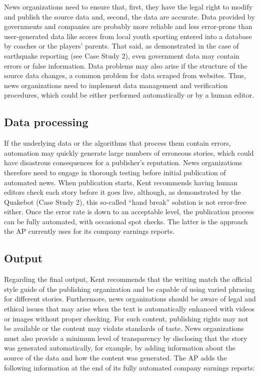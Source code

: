 \documentclass[notoc, symmetric, nobib, nols]{towcenter-guideto-book}
\begin{document}
News organizations need to ensure that, first, they have the legal right to modify and publish the source data and, second, the data are accurate. Data provided by governments and companies are probably more reliable and less error-prone than user-generated data like scores from local youth sporting entered into a database by coaches or the players' parents. That said, as demonstrated in the case of earthquake reporting (see Case Study 2), even government data may contain errors or false information. Data problems may also arise if the structure of the source data changes, a common problem for data scraped from websites. Thus, news organizations need to implement data management and verification procedures, which could be either performed automatically or by a human editor.

\subsection{Data processing}

If the underlying data or the algorithms that process them contain errors, automation may quickly generate large numbers of erroneous stories, which could have disastrous consequences for a publisher's reputation. News organizations therefore need to engage in thorough testing before initial publication of automated news. When publication starts, Kent recommends having human editors check each story before it goes live, although, as demonstrated by the Quakebot (Case Study 2), this so-called ``hand break'' solution is not error-free either. Once the error rate is down to an acceptable level, the publication process can be fully automated, with occasional spot checks. The latter is the approach the AP currently uses for its company earnings reports.

\subsection{Output} 

Regarding the final output, Kent recommends that the writing match the official style guide of the publishing organization and be capable of using varied phrasing for different stories. Furthermore, news organizations should be aware of legal and ethical issues that may arise when the text is automatically enhanced with videos or images without proper checking. For such content, publishing rights may not be available or the content may violate standards of taste. News organizations must also provide a minimum level of transparency by disclosing that the story was generated automatically, for example, by adding information about the source of the data and how the content was generated. The AP adds the following information at the end of its fully automated company earnings reports:
 
\end{document}
